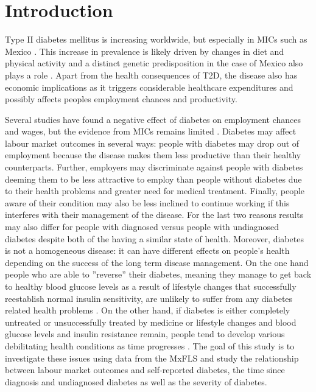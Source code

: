 \section{\noindent \label{sec:Introduction}Introduction}

Type II diabetes mellitus is increasing worldwide, but especially
in \ac{MICs} such as Mexico \citep{InternationalDiabetesFederation2013}.
This increase in prevalence is likely driven by changes in diet and
physical activity \citep{Barquera2008b,Basu2013} and a distinct genetic
predisposition in the case of Mexico also plays a role \citep{Williams2013}.
Apart from the health consequences of \ac{T2D}, the disease also has economic implications as it triggers considerable healthcare expenditures and possibly affects peoples employment chances and productivity. 

Several studies have found a negative effect of diabetes
on employment chances and wages, but the evidence from \ac{MICs}
remains limited \citep{Seuring2015a}. Diabetes may affect labour
market outcomes in several ways: people with diabetes may drop
out of employment because the disease makes them less productive than their healthy counterparts. Further, employers
may discriminate against people with diabetes deeming them to be
less attractive to employ than people without diabetes due to their health
problems and greater need for medical treatment. Finally, people aware
of their condition may also be less inclined to continue working
if this interferes with their management of the disease.
For the last two reasons results may also differ
for people with diagnosed versus people with undiagnosed diabetes
despite both of the having a similar state of health. Moreover, diabetes
is not a homogeneous disease: it can have different
effects on people's health depending on the success of the long term
disease management. On the one hand people who are able to ''reverse''
their diabetes, meaning they manage to get back to healthy blood
glucose levels as a result of lifestyle changes that successfully
reestablish normal insulin sensitivity, are unlikely to suffer from
any diabetes related health problems \citep{Lim2011,Gregg2012}. On
the other hand, if diabetes is either completely untreated or unsuccessfully
treated by medicine or lifestyle changes and blood glucose levels and insulin resistance
remain, people tend to develop various debilitating health conditions
as time progresses \citep{Reynoso-Noveron2011}. The goal of this
study is to investigate these issues using data from the \acf{MxFLS}
and study the relationship between labour market outcomes and self-reported diabetes,
the time since diagnosis and undiagnosed diabetes as well as the severity
of diabetes.

